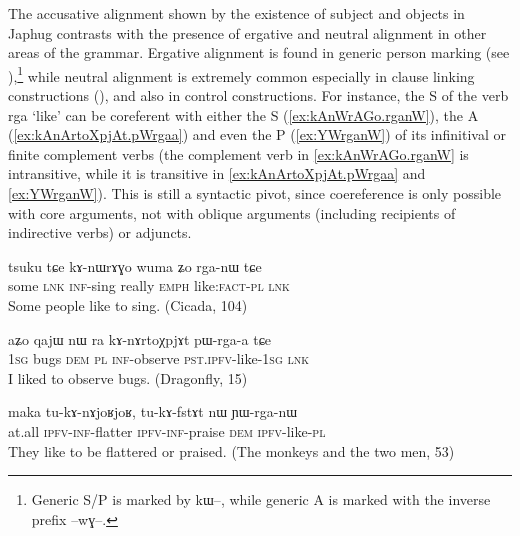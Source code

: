 \documentclass[oldfontcommands,oneside,a4paper,11pt]{article}
\newcommand{\ipa}[1]{{\phon #1}} %
\begin{document}
The accusative alignment shown by the existence of subject and objects in Japhug contrasts with the presence of ergative and neutral alignment  in other areas of the grammar. Ergative alignment is found in generic person marking (see \citealt{jacques12demotion}),\footnote{Generic S/P is marked by \ipa{kɯ--}, while generic A is marked with the inverse prefix \ipa{--wɣ--}.} while neutral alignment is extremely common especially in clause linking constructions (\citealt{jacques14linking}), and also in control constructions. For instance, the S of the verb \ipa{rga}  `like' can be coreferent with either the S  (\ref{ex:kAnWrAGo.rganW}), the A (\ref{ex:kAnArtoXpjAt.pWrgaa}) and even the P (\ref{ex:YWrganW}) of its infinitival or finite  complement verbs (the complement verb in \ref{ex:kAnWrAGo.rganW} is intransitive, while it is transitive in \ref{ex:kAnArtoXpjAt.pWrgaa} and \ref{ex:YWrganW}). This is still a syntactic pivot, since  coereference is only possible with core arguments, not with oblique arguments (including recipients of indirective verbs) or adjuncts.
    \begin{exe}
   \ex   \label{ex:kAnWrAGo.rganW} 
\gll
\ipa{tsuku}  	\ipa{tɕe}  	\ipa{kɤ-nɯrɤɣo}  	\ipa{wuma}  	\ipa{ʑo}  	\ipa{rga-nɯ}  	\ipa{tɕe}  \\
some \textsc{lnk} \textsc{inf}-sing really \textsc{emph} like:\textsc{fact-pl}  \textsc{lnk} \\
  \glt Some people like to sing. (Cicada, 104)
     \end{exe}  
 
   \begin{exe}
   \ex   \label{ex:kAnArtoXpjAt.pWrgaa} 
\gll
  	\ipa{aʑo}  	\ipa{qajɯ}  	\ipa{nɯ} \ipa{ra}  	\ipa{kɤ-nɤrtoχpjɤt}  	\ipa{pɯ-rga-a}  	\ipa{tɕe}  	\\
  	\textsc{1sg} bugs \textsc{dem} \textsc{pl} \textsc{inf}-observe \textsc{pst.ipfv}-like-\textsc{1sg} \textsc{lnk}  \\
 \glt I liked to observe bugs. (Dragonfly, 15)
     \end{exe}  
 
  \begin{exe}
   \ex   \label{ex:YWrganW} 
\gll
\ipa{maka}  	\ipa{tu-kɤ-nɤjoʁjoʁ,}  	\ipa{tu-kɤ-fstɤt}  	\ipa{nɯ}  	\ipa{ɲɯ-rga-nɯ}  \\
at.all \textsc{ipfv-inf}-flatter \textsc{ipfv-inf}-praise \textsc{dem} \textsc{ipfv}-like-\textsc{pl} \\
\glt They like to be flattered or praised. (The monkeys and the two men, 53)
    \end{exe}  
 
\end{document}
